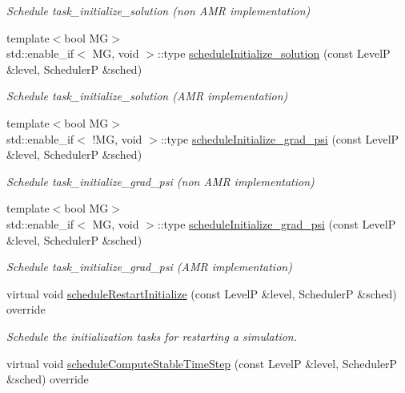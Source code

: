 \begin{DoxyCompactItemize}
\begin{DoxyCompactList}\small\item\em Schedule task\+\_\+initialize\+\_\+solution (non A\+MR implementation) \end{DoxyCompactList}\item 
{\footnotesize template$<$bool MG$>$ }\\std\+::enable\+\_\+if$<$ MG, void $>$\+::type \hyperlink{classUintah_1_1PhaseField_1_1PureMetal_a1af29773c5193a9dbb14ff3988bba4fd}{schedule\+Initialize\+\_\+solution} (const LevelP \&level, SchedulerP \&sched)
\begin{DoxyCompactList}\small\item\em Schedule task\+\_\+initialize\+\_\+solution (A\+MR implementation) \end{DoxyCompactList}\item 
{\footnotesize template$<$bool MG$>$ }\\std\+::enable\+\_\+if$<$ !MG, void $>$\+::type \hyperlink{classUintah_1_1PhaseField_1_1PureMetal_a08fd26626ff3782a5805db3725d2da25}{schedule\+Initialize\+\_\+grad\+\_\+psi} (const LevelP \&level, SchedulerP \&sched)
\begin{DoxyCompactList}\small\item\em Schedule task\+\_\+initialize\+\_\+grad\+\_\+psi (non A\+MR implementation) \end{DoxyCompactList}\item 
{\footnotesize template$<$bool MG$>$ }\\std\+::enable\+\_\+if$<$ MG, void $>$\+::type \hyperlink{classUintah_1_1PhaseField_1_1PureMetal_a08fd26626ff3782a5805db3725d2da25}{schedule\+Initialize\+\_\+grad\+\_\+psi} (const LevelP \&level, SchedulerP \&sched)
\begin{DoxyCompactList}\small\item\em Schedule task\+\_\+initialize\+\_\+grad\+\_\+psi (A\+MR implementation) \end{DoxyCompactList}\item 
virtual void \hyperlink{classUintah_1_1PhaseField_1_1PureMetal_a8f3e42d3aeb21f8b07400dc05bcb0ebc}{schedule\+Restart\+Initialize} (const LevelP \&level, SchedulerP \&sched) override
\begin{DoxyCompactList}\small\item\em Schedule the initialization tasks for restarting a simulation. \end{DoxyCompactList}\item 
virtual void \hyperlink{classUintah_1_1PhaseField_1_1PureMetal_aa8315804eb12ca8eaf7dbe2bed83922e}{schedule\+Compute\+Stable\+Time\+Step} (const LevelP \&level, SchedulerP \&sched) override

\end{DoxyCompactItemize}
